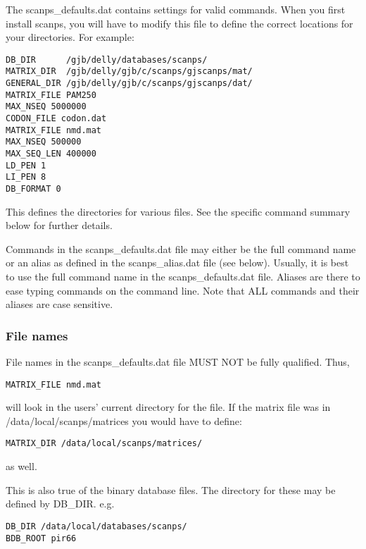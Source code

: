 \documentclass[12pt]{article}
\begin{document}
The scanps\_defaults.dat contains settings for valid commands.  When
you first install scanps, you will have to modify this file to define
the correct locations for your directories.  For example:

\begin{scriptsize}
\begin{verbatim}
DB_DIR      /gjb/delly/databases/scanps/
MATRIX_DIR  /gjb/delly/gjb/c/scanps/gjscanps/mat/ 
GENERAL_DIR /gjb/delly/gjb/c/scanps/gjscanps/dat/
MATRIX_FILE PAM250
MAX_NSEQ 5000000
CODON_FILE codon.dat
MATRIX_FILE nmd.mat
MAX_NSEQ 500000
MAX_SEQ_LEN 400000
LD_PEN 1 
LI_PEN 8
DB_FORMAT 0
\end{verbatim}
\end{scriptsize}

This defines the directories for various files.  See the specific
command summary below for further details.

Commands in the scanps\_defaults.dat file may either be the full
command name or an alias as defined in the scanps\_alias.dat file (see
below).  Usually, it is best to use the full command name in the
scanps\_defaults.dat file.  Aliases are there to ease typing commands
on the command line.  Note that ALL commands and their aliases are
case sensitive.


\subsubsection{File names}

File names in the scanps\_defaults.dat file MUST NOT be fully 
qualified.  Thus, 

\begin{verbatim}
MATRIX_FILE nmd.mat
\end{verbatim}

will look in the users' current directory for the file.  If the matrix
file was in /data/local/scanps/matrices you would have to define:

\begin{verbatim}
MATRIX_DIR /data/local/scanps/matrices/
\end{verbatim}

as well.

This is also true of the  binary database files.  The directory
for these may be defined by DB\_DIR.  e.g.

\begin{verbatim}
DB_DIR /data/local/databases/scanps/
BDB_ROOT pir66
\end{verbatim}
\end{document}
